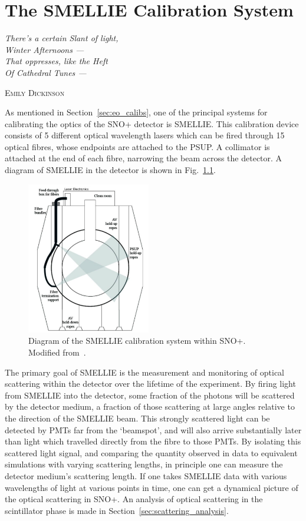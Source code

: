 \chapter{The SMELLIE Calibration System}\label{chap:smellie_hardware}
\epigraph{\textit{There's a certain Slant of light,\\
Winter Afternoons ---\\
That oppresses, like the Heft\\
Of Cathedral Tunes ---}}{\textsc{Emily Dickinson}}

As mentioned in Section~\ref{sec:eo_calibs}, one of the principal systems for calibrating the optics of the SNO+ detector is SMELLIE. This calibration device consists of 5 different optical wavelength lasers which can be fired through 15 optical fibres, whose endpoints are attached to the PSUP. A collimator is attached at the end of each fibre, narrowing the beam across the detector. A diagram of SMELLIE in the detector is shown in Fig.~\ref{fig:smellie_diagram}.

\begin{figure}
    \centering
    \includegraphics[width=0.48\textwidth]{3_SMELLIEHardware/images/SMELLIE_picture_corrected.png}
    \caption[Diagram of the SMELLIE calibration system within SNO+]
    {Diagram of the SMELLIE calibration system within SNO+. Modified from~\cite{sinclairPositioningTimingCalibration2015}.}
    \label{fig:smellie_diagram}
\end{figure}

The primary goal of SMELLIE is the measurement and monitoring of optical scattering within the detector over the lifetime of the experiment. By firing light from SMELLIE into the detector, some fraction of the photons will be scattered by the detector medium, a fraction of those scattering at large angles relative to the direction of the SMELLIE beam. This strongly scattered light can be detected by PMTs far from the `beamspot', and will also arrive substantially later than light which travelled directly from the fibre to those PMTs. By isolating this scattered light signal, and comparing the quantity observed in data to equivalent simulations with varying scattering lengths, in principle one can measure the detector medium's scattering length. If one takes SMELLIE data with various wavelengths of light at various points in time, one can get a dynamical picture of the optical scattering in SNO+. An analysis of optical scattering in the scintillator phase is made in Section~\ref{sec:scattering_analysis}.

